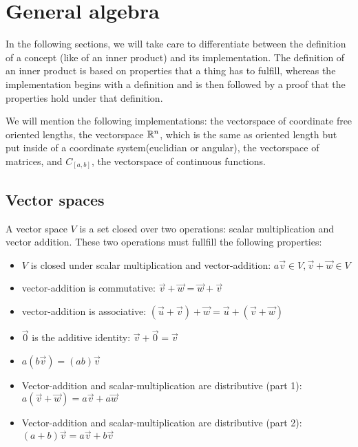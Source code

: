 \section{General algebra}
In the following sections, we will take care to differentiate between the definition of a concept (like of an inner product) and its implementation. The definition of an inner product is based on properties that a thing has to fulfill, whereas the implementation begins with a definition and is then followed by a proof that the properties hold under that definition.

We will mention the following implementations: the vectorspace of coordinate free oriented lengths, the vectorspace $\mathbb{R}^n$, which is the same as oriented length but put inside of a coordinate system(euclidian or angular), the vectorspace of matrices, and $C_{[a,b]}$, the vectorspace of continuous functions.

\subsection{Vector spaces}
 

\begin{definition} A vector space $V$ is a set closed over two operations: scalar multiplication and vector addition. These two operations must fullfill the following properties:
\begin{itemize}
    \item $V$ is closed under scalar multiplication and vector-addition: $a\vec{v} \in V, \vec{v} + \vec{w} \in V$
    \item vector-addition is commutative: $\vec{v} + \vec{w} = \vec{w} + \vec{v}$
    \item vector-addition is associative: $(\vec{u} + \vec{v}) + \vec{w} = \vec{u} + (\vec{v} + \vec{w})$
    \item $\vec{0}$ is the additive identity: $\vec{v} + \vec{0} = \vec{v}$
    
    \item $a(b\vec{v}) = (ab)\vec{v}$
    \item Vector-addition and scalar-multiplication are distributive (part 1): $a(\vec{v} + \vec{w}) = a\vec{v} + a\vec{w}$
    \item Vector-addition and scalar-multiplication are distributive (part 2): $(a+b)\vec{v} = a\vec{v} + b\vec{v}$
\end{itemize}
\end{definition}

